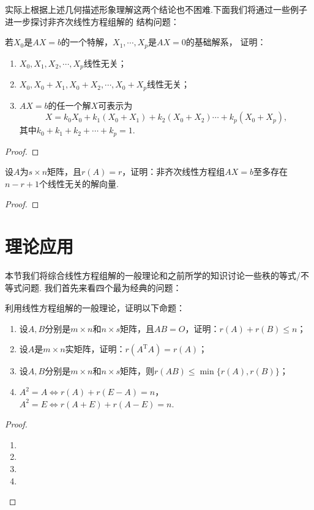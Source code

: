 实际上根据上述几何描述形象理解这两个结论也不困难.下面我们将通过一些例子进一步探讨非齐次线性方程组解的
结构问题：
\begin{example}
    若$X_0$是$AX=b$的一个特解，$X_1,\cdots,X_p$是$AX=0$的基础解系，
	证明：
	\begin{enumerate}[label=(\arabic*)]
        \item $X_0,X_1,X_2,\cdots,X_p$线性无关；
        \item $X_0,X_0+X_1,X_0+X_2,\cdots,X_0+X_p$线性无关；
        \item $AX=b$的任一个解$X$可表示为
        \[X=k_0X_0+k_1(X_0+X_1)+k_2(X_0+X_2)\cdots+k_p(X_0+X_p),\]
        其中$k_0+k_1+k_2+\cdots+k_p=1$.
    \end{enumerate}
\end{example}
\begin{proof}
    
\end{proof}

\begin{example}
    设$A$为$s \times n$矩阵，且$r(A)=r$，证明：非齐次线性方程组$AX=b$至多存在$n-r+1$个线性无关的解向量.
\end{example}
\begin{proof}
    
\end{proof}

\section{理论应用}
本节我们将综合线性方程组解的一般理论和之前所学的知识讨论一些秩的等式/不等式问题.
我们首先来看四个最为经典的问题：
\begin{example}
    利用线性方程组解的一般理论，证明以下命题：
    \begin{enumerate}
        \item 设$A,B$分别是$m \times n$和$n \times s$矩阵，且$AB=O$，证明：$r(A)+r(B)\leqslant n$；

        \item 设$A$是$m \times n$实矩阵，证明：$r(A^\mathrm{T}A)=r(A)$；

        \item 设$A,B$分别是$m \times n$和$n \times s$矩阵，则$r(AB)\leqslant\min\{r(A),r(B)\}$；

        \item $A^2=A \iff r(A)+r(E-A)=n$，$A^2=E \iff r(A+E)+r(A-E)=n$.
    \end{enumerate}
\end{example}
\begin{proof}
    \begin{enumerate}
        \item 
        \item 
        \item 
        \item 
    \end{enumerate}
\end{proof}

